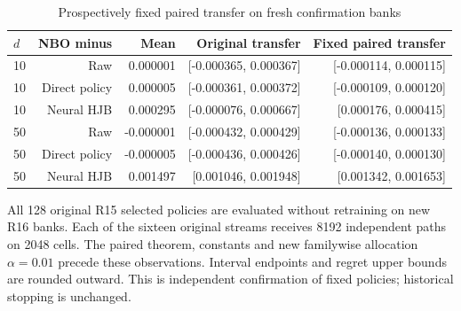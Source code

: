 \begin{table}[!htbp]
\centering\small
\caption{Prospectively fixed paired transfer on fresh confirmation banks}
\label{tab:r16-replication-comparisons}
\begin{tabular}{lrrrr}
\toprule
$d$ & NBO minus & Mean & Original transfer & Fixed paired transfer \\
\midrule
10 & Raw & 0.000001 & [-0.000365, 0.000367] & [-0.000114, 0.000115] \\
10 & Direct policy & 0.000005 & [-0.000361, 0.000372] & [-0.000109, 0.000120] \\
10 & Neural HJB & 0.000295 & [-0.000076, 0.000667] & [0.000176, 0.000415] \\
50 & Raw & -0.000001 & [-0.000432, 0.000429] & [-0.000136, 0.000133] \\
50 & Direct policy & -0.000005 & [-0.000436, 0.000426] & [-0.000140, 0.000130] \\
50 & Neural HJB & 0.001497 & [0.001046, 0.001948] & [0.001342, 0.001653] \\
\bottomrule
\end{tabular}
\par\medskip\noindent\footnotesize All 128 original R15 selected policies are evaluated without retraining on new R16 banks. Each of the sixteen original streams receives 8192 independent paths on 2048 cells. The paired theorem, constants and new familywise allocation $\alpha=0.01$ precede these observations. Interval endpoints and regret upper bounds are rounded outward. This is independent confirmation of fixed policies; historical stopping is unchanged.
\end{table}

